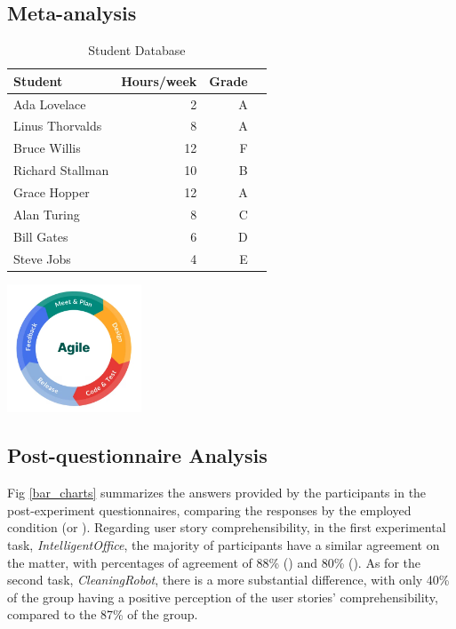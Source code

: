 \subsection{Meta-analysis}
\begin{table}[ht]
    \begin{minipage}[b]{0.56\linewidth}
        \centering
        \begin{tabular}{ | l | r | r | r |}
            \hline
            Student & Hours/week & Grade \\ \hline \hline
            Ada Lovelace & 2 & A \\ \hline
            Linus Thorvalds & 8 & A \\ \hline
            Bruce Willis & 12 & F \\ \hline
            Richard Stallman & 10 & B \\ \hline
            Grace Hopper & 12 & A \\ \hline
            Alan Turing & 8 & C \\ \hline
            Bill Gates & 6 & D \\ \hline
            Steve Jobs & 4 & E \\ \hline
        \end{tabular}
        \caption{Student Database}
        \label{table:student}
    \end{minipage}\hfill
    \begin{minipage}[b]{0.4\linewidth}
        \centering
        \includegraphics[width=40mm]{figures/agile_model.jpg}
        \label{fig:image}
    \end{minipage}
\end{table}



\subsection{Post-questionnaire Analysis}
Fig \ref{bar_charts} summarizes the answers provided by the participants in the post-experiment questionnaires, comparing the responses by the employed condition (\tdd or \notdd).
Regarding user story comprehensibility, in the first experimental task, \textit{IntelligentOffice}, the majority of participants have a similar agreement on the matter, with percentages of agreement of 88\% (\tdd) and 80\% (\notdd). As for the second task, \textit{CleaningRobot}, there is a more substantial difference, with only 40\% of the \tdd group having a positive perception of the user stories' comprehensibility, compared to the 87\% of the \notdd group.

